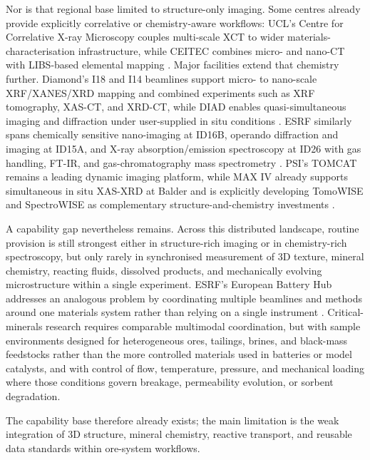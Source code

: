 \documentclass[12pt,a4paper]{article}
\begin{document}
Nor is that regional base limited to structure-only imaging. Some centres already provide explicitly correlative or chemistry-aware workflows: UCL's Centre for Correlative X-ray Microscopy couples multi-scale XCT to wider materials-characterisation infrastructure, while CEITEC combines micro- and nano-CT with LIBS-based elemental mapping \cite{ucl_correlative_xray_2026, ceitec_xct_2026}. Major facilities extend that chemistry further. Diamond's I18 and I14 beamlines support micro- to nano-scale XRF/XANES/XRD mapping and combined experiments such as XRF tomography, XAS-CT, and XRD-CT, while DIAD enables quasi-simultaneous imaging and diffraction under user-supplied in situ conditions \cite{diamond_xrf_2026, diamond_diad_2026}. ESRF similarly spans chemically sensitive nano-imaging at ID16B, operando diffraction and imaging at ID15A, and X-ray absorption/emission spectroscopy at ID26 with gas handling, FT-IR, and gas-chromatography mass spectrometry \cite{esrf_id16b_2026, esrf_id15a_2026, esrf_id26_2026}. PSI's TOMCAT remains a leading dynamic imaging platform, while MAX IV already supports simultaneous in situ XAS-XRD at Balder and is explicitly developing TomoWISE and SpectroWISE as complementary structure-and-chemistry investments \cite{psi_tomcat_2025, maxiv_balder_2026, maxiv_beamlines_2024}.

A capability gap nevertheless remains. Across this distributed landscape, routine provision is still strongest either in structure-rich imaging or in chemistry-rich spectroscopy, but only rarely in synchronised measurement of 3D texture, mineral chemistry, reacting fluids, dissolved products, and mechanically evolving microstructure within a single experiment. ESRF's European Battery Hub addresses an analogous problem by coordinating multiple beamlines and methods around one materials system rather than relying on a single instrument \cite{esrf_eubat_2026}. Critical-minerals research requires comparable multimodal coordination, but with sample environments designed for heterogeneous ores, tailings, brines, and black-mass feedstocks rather than the more controlled materials used in batteries or model catalysts, and with control of flow, temperature, pressure, and mechanical loading where those conditions govern breakage, permeability evolution, or sorbent degradation.

The capability base therefore already exists; the main limitation is the weak integration of 3D structure, mineral chemistry, reactive transport, and reusable data standards within ore-system workflows.
\end{document}
